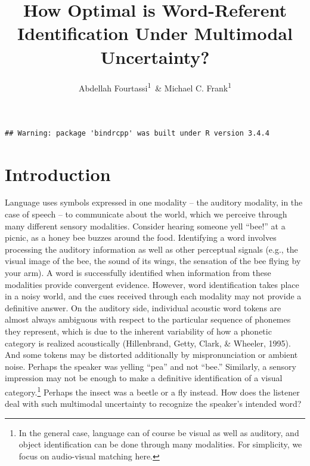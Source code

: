 \documentclass[english,,man,floatsintext]{apa6}
\title{How Optimal is Word-Referent Identification Under Multimodal
Uncertainty?}
\author{Abdellah Fourtassi\textsuperscript{1}~\& Michael C.
Frank\textsuperscript{1}}
\date{}
\affiliation{
\vspace{0.5cm}
\textsuperscript{1} Department of Psychology, Stanford University}
\let\rmarkdownfootnote\footnote%
\def\footnote{\protect\rmarkdownfootnote}
\theoremstyle{definition}
\theoremstyle{definition}
\theoremstyle{definition}
\theoremstyle{remark}
\begin{document}
\maketitle

\begin{verbatim}
## Warning: package 'bindrcpp' was built under R version 3.4.4
\end{verbatim}

\section{Introduction}\label{introduction}

Language uses symbols expressed in one modality -- the auditory
modality, in the case of speech -- to communicate about the world, which
we perceive through many different sensory modalities. Consider hearing
someone yell \enquote{bee!} at a picnic, as a honey bee buzzes around
the food. Identifying a word involves processing the auditory
information as well as other perceptual signals (e.g., the visual image
of the bee, the sound of its wings, the sensation of the bee flying by
your arm). A word is successfully identified when information from these
modalities provide convergent evidence. However, word identification
takes place in a noisy world, and the cues received through each
modality may not provide a definitive answer. On the auditory side,
individual acoustic word tokens are almost always ambiguous with respect
to the particular sequence of phonemes they represent, which is due to
the inherent variability of how a phonetic category is realized
acoustically (Hillenbrand, Getty, Clark, \& Wheeler, 1995). And some
tokens may be distorted additionally by mispronunciation or ambient
noise. Perhaps the speaker was yelling \enquote{pea} and not
\enquote{bee.} Similarly, a sensory impression may not be enough to make
a definitive identification of a visual
category.\footnote{In the general case, language can of course be visual as well as auditory, and object identification can be done through many modalities. For simplicity, we focus on audio-visual matching here.}
Perhaps the insect was a beetle or a fly instead. How does the listener
deal with such multimodal uncertainty to recognize the speaker's
intended word?
\end{document}
